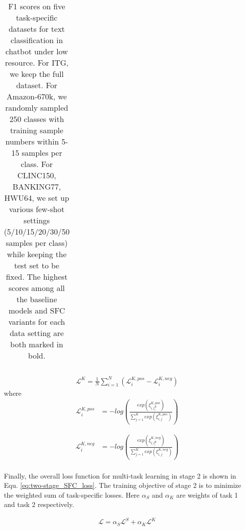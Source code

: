 \begin{table*}
\begin{centering}
{\begin{tabular}{|c|cccccc|cccccc|cccccc|c|c|}
        & & & & & & & & & & & & & & & & & & & &\tabularnewline
        \hline
      \end{tabular}
    }
    \par
  \end{centering}
  \caption{
    F1 scores on five task-specific datasets for text classification in chatbot
    under low resource. For ITG, we keep the full dataset. For Amazon-670k, we
    randomly sampled 250 classes with training sample numbers within 5-15
    samples per class. For CLINC150, BANKING77, HWU64, we set up various
    few-shot settings (5/10/15/20/30/50 samples per class) while keeping the
    test set to be fixed. The highest scores among all the baseline models and SFC variants for each data setting are both marked
    in bold.
  }
  \label{tbe:table2}
\end{table*}

\vspace{-1em}
\begin{align}
  \mathcal{L}^{K} = \frac{1}{N}\sum_{i=1}^{N}(\mathcal{L}^{K,pos}_{i} - \mathcal{L}^{K,neg}_{i})
  \label{eq:top-k_classification_loss}
\end{align}
where
\begin{equation}
  \begin{aligned}
    \mathcal{L}^{K,pos}_{i} &= -log(\frac{exp(\xi_{i,l^{K}_{i}}^{K,pos})}{\sum_{j=1}^{K}exp(\xi_{i,j}^{K,pos})})
    \label{eq: pos top-k loss}
  \end{aligned}
\end{equation}

\begin{equation}
  \begin{aligned}
    \mathcal{L}^{K,neg}_{i} &= -log(\frac{exp(\xi_{i,l^{K}_{i}}^{K,neg})}{\sum_{j=1}^{K}exp(\xi_{i,j}^{K,neg})}) \\
    \label{eq: neg top-k loss}
  \end{aligned}
\end{equation}
\vspace{-1.25em}

Finally, the overall loss function for multi-task learning in stage 2 is
shown in Equ. \ref{eq:two-stage_SFC_loss}. The training objective of stage 2 is
to minimize the weighted sum of task-specific losses. Here $\alpha_S$ and
$\alpha_K$ are weights of task 1 and task 2 respectively.

\begin{align}
  \mathcal{L} = \alpha_S \mathcal{L}^S + \alpha_K \mathcal{L}^K
  \label{eq:two-stage_SFC_loss}
\end{align}
\vspace{-2em}

